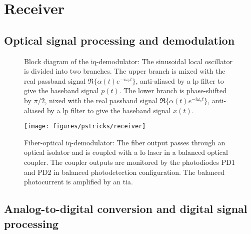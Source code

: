 \section{Receiver}


\subsection{Optical signal processing and demodulation}

\begin{figure}[htb]
	\centering
	
	\caption{Block diagram of the \gls{iq}-demodulator: The sinusoidal local oscillator is divided into two branches. The upper branch is mixed with the real passband signal $\Re\{\alpha(t)e^{-i\omega_ct}\}$, anti-aliased by a \gls{lp} filter to give the baseband signal $p(t)$. The lower branch is phase-shifted by $\pi/2$, nixed with the real passband signal $\Re\{\alpha(t)e^{-i\omega_ct}\}$, anti-aliased by a \gls{lp} filter to give the baseband signal $x(t)$.}\label{fig:demodulator}
\end{figure}

\begin{figure}[htb]
	\centering
	\texttt{[image: figures/pstricks/receiver]}
	\caption{Fiber-optical \gls{iq}-demodulator: The fiber output passes through an optical isolator and is coupled with a \gls{lo} laser in a balanced optical coupler. The coupler outputs are monitored by the photodiodes PD1 and PD2 in balanced photodetection configuration. The balanced photocurrent is amplified by an \gls{tia}.}
\end{figure}

\subsection{Analog-to-digital conversion and digital signal processing}

